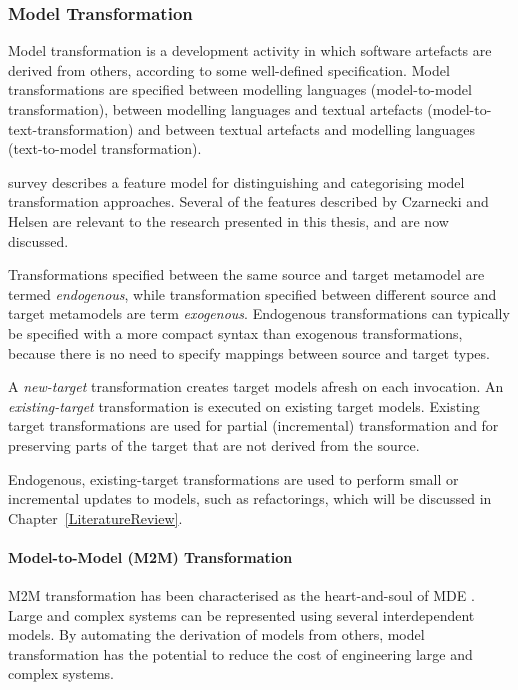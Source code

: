 \subsubsection{Model Transformation}
Model transformation is a development activity in which software artefacts are derived from others, according to some well-defined specification. Model transformations are specified between modelling languages (model-to-model transformation), between modelling languages and textual artefacts (model-to-text-transformation) and between textual artefacts and modelling languages (text-to-model transformation).

\cite{czarnecki06survey} survey describes a feature model for distinguishing and categorising model transformation approaches. Several of the features described by Czarnecki and Helsen are relevant to the research presented in this thesis, and are now discussed. 


Transformations specified between the same source and target metamodel are termed \emph{endogenous}, while transformation specified between different source and target metamodels are term \emph{exogenous}. Endogenous transformations can typically be specified with a more compact syntax than exogenous transformations, because there is no need to specify mappings between source and target types.

A \emph{new-target} transformation creates target models afresh on each invocation. An \emph{existing-target} transformation is executed on existing target models. Existing target transformations are used for partial (incremental) transformation and for preserving parts of the target that are not derived from the source.

Endogenous, existing-target transformations are used to perform small or incremental updates to models, such as refactorings, which will be discussed in Chapter~\ref{LiteratureReview}.


\paragraph{Model-to-Model (M2M) Transformation} M2M transformation has been characterised as the heart-and-soul of MDE \cite{sendall03heart}. Large and complex systems can be represented using several interdependent models. By automating the derivation of models from others, model transformation has the potential to reduce the cost of engineering large and complex systems.

